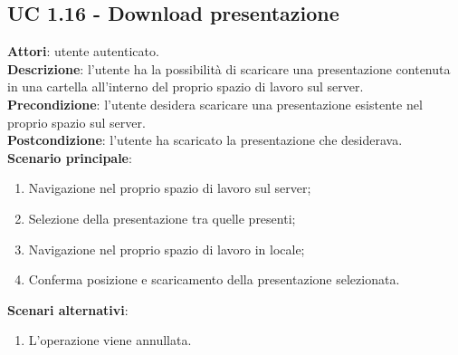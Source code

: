 \subsection{UC 1.16 - Download presentazione}{
	\label{uc1.16}
	\textbf{Attori}: utente autenticato.	\\
	\textbf{Descrizione}: l'utente ha la possibilità di scaricare una presentazione contenuta in una cartella all'interno del proprio spazio di lavoro sul server. \\
	\textbf{Precondizione}: l'utente desidera scaricare una presentazione esistente nel proprio spazio sul server.	\\
	\textbf{Postcondizione}: l'utente ha scaricato la presentazione che desiderava.	\\
	\textbf{Scenario principale}:
	\begin{enumerate}
		\item Navigazione nel proprio spazio di lavoro sul server;
		\item Selezione della presentazione tra quelle presenti;
		\item Navigazione nel proprio spazio di lavoro in locale;
		\item Conferma posizione e scaricamento della presentazione selezionata.
	\end{enumerate}
	\textbf{Scenari alternativi}: 
	\begin{enumerate}
		\item L'operazione viene annullata.
	\end{enumerate}
	}